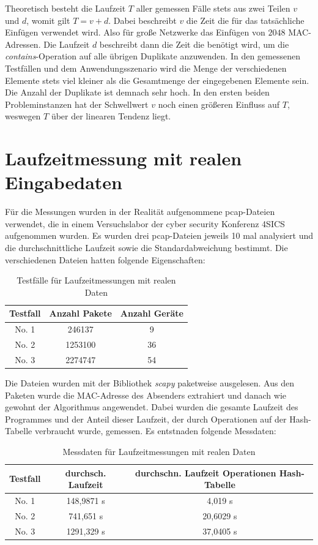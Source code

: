 Theoretisch besteht die Laufzeit \(T\) aller gemessen Fälle stets aus zwei Teilen \(v\) und \(d\), womit gilt \(T=v+d\). Dabei beschreibt \(v\) die Zeit die für das tatsächliche Einfügen verwendet wird. Also für große Netzwerke das Einfügen von \(2048\) MAC-Adressen. Die Laufzeit \(d\) beschreibt dann die Zeit die benötigt wird, um die \textit{contains}-Operation auf alle übrigen Duplikate anzuwenden. In den gemessenen Testfällen und dem Anwendungsszenario wird die Menge der verschiedenen Elemente stets viel kleiner als die Gesamtmenge der eingegebenen Elemente sein. Die Anzahl der Duplikate ist demnach sehr hoch. In den ersten beiden Probleminstanzen hat der Schwellwert \(v\) noch einen größeren Einfluss auf \(T\), weswegen \(T\) über der linearen Tendenz liegt.

\section{Laufzeitmessung mit realen Eingabedaten}
Für die Messungen wurden in der Realität aufgenommene pcap-Dateien verwendet, die in einem Versuchslabor der cyber security Konferenz 4SICS aufgenommen wurden. Es wurden drei pcap-Dateien jeweils 10 mal analysiert und die durchschnittliche Laufzeit sowie die Standardabweichung bestimmt. Die verschiedenen Dateien hatten folgende Eigenschaften:
\begin{table}[H]
	\centering
	\begin{tabular}{|c|c|c|}
		\hline
		Testfall & Anzahl Pakete & Anzahl Geräte \\ \hline
		No. 1 & 246137 & 9 \\
		No. 2 & 1253100 & 36 \\
		No. 3 & 2274747 & 54 \\ \hline
	\end{tabular}
	\caption{Testfälle für Laufzeitmessungen mit realen Daten}
\end{table}
Die Dateien wurden mit der Bibliothek \textit{scapy} paketweise ausgelesen. Aus den Paketen wurde die MAC-Adresse des Absenders extrahiert und danach wie gewohnt der Algorithmus angewendet. Dabei wurden die gesamte Laufzeit des Programmes und der Anteil dieser Laufzeit, der durch Operationen auf der Hash-Tabelle verbraucht wurde, gemessen. Es entstnaden folgende Messdaten:
\begin{table}[H]
	\centering
	\begin{tabular}{|c|c|c|}
		\hline
		Testfall & durchsch. Laufzeit & durchschn. Laufzeit Operationen Hash-Tabelle \\ \hline
		No. 1 & 148,9871 s & 4,019 s \\
		No. 2 & 741,651 s & 20,6029 s \\
		No. 3 & 1291,329 s & 37,0405 s \\ \hline
	\end{tabular}
	\caption{Messdaten für Laufzeitmessungen mit realen Daten}
\end{table}
